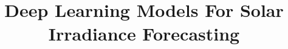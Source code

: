 \documentclass[a4paper,fleqn]{cas-sc}
\begin{document}
\let\WriteBookmarks\relax
\def\floatpagepagefraction{1}
\def\textpagefraction{.001}



\title [mode = title]{Deep Learning Models For Solar Irradiance Forecasting}  

\end{document}
